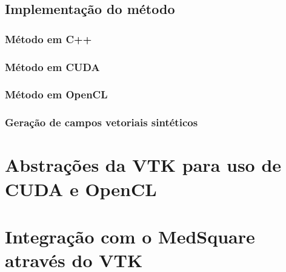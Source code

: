   \subsection{Implementação do método}
    \subsubsection{Método em C++}
    \subsubsection{Método em CUDA}
    \subsubsection{Método em OpenCL}
    \subsubsection{Geração de campos vetoriais sintéticos}
    
\section{Abstrações da VTK para uso de CUDA e OpenCL}
\section{Integração com o MedSquare através do VTK}
